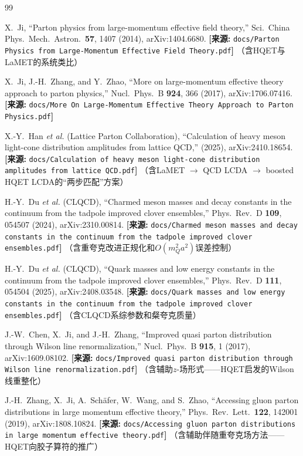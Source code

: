 \documentclass[12pt,a4paper]{ctexart}
\theoremstyle{definition}
\begin{document}
\begin{thebibliography}{99}

X.~Ji,
``Parton physics from large-momentum effective field theory,''
Sci.\ China Phys.\ Mech.\ Astron.\ \textbf{57}, 1407 (2014), arXiv:1404.6680.
\quad\textbf{[来源:} \texttt{docs/Parton Physics from Large-Momentum Effective Field Theory.pdf}\textbf{]}
（含HQET与LaMET的系统类比）

X.~Ji, J.-H.~Zhang, and Y.~Zhao,
``More on large-momentum effective theory approach to parton physics,''
Nucl.\ Phys.\ B \textbf{924}, 366 (2017), arXiv:1706.07416.
\quad\textbf{[来源:} \texttt{docs/More On Large-Momentum Effective Theory Approach to Parton Physics.pdf}\textbf{]}

X.-Y.~Han \textit{et al.} (Lattice Parton Collaboration),
``Calculation of heavy meson light-cone distribution amplitudes from lattice QCD,''
(2025), arXiv:2410.18654.
\quad\textbf{[来源:} \texttt{docs/Calculation of heavy meson light-cone distribution amplitudes from lattice QCD.pdf}\textbf{]}
（含LaMET $\to$ QCD LCDA $\to$ boosted HQET LCDA的``两步匹配''方案）

H.-Y.~Du \textit{et al.} (CLQCD),
``Charmed meson masses and decay constants in the continuum from the tadpole improved clover ensembles,''
Phys.\ Rev.\ D \textbf{109}, 054507 (2024), arXiv:2310.00814.
\quad\textbf{[来源:} \texttt{docs/Charmed meson masses and decay constants in the continuum from the tadpole improved clover ensembles.pdf}\textbf{]}
（含重夸克改进正规化和$O(m^2_Q a^2)$误差控制）

H.-Y.~Du \textit{et al.} (CLQCD),
``Quark masses and low energy constants in the continuum from the tadpole improved clover ensembles,''
Phys.\ Rev.\ D \textbf{111}, 054504 (2025), arXiv:2408.03548.
\quad\textbf{[来源:} \texttt{docs/Quark masses and low energy constants in the continuum from the tadpole improved clover ensembles.pdf}\textbf{]}
（含CLQCD系综参数和粲夸克质量）

J.-W.~Chen, X.~Ji, and J.-H.~Zhang,
``Improved quasi parton distribution through Wilson line renormalization,''
Nucl.\ Phys.\ B \textbf{915}, 1 (2017), arXiv:1609.08102.
\quad\textbf{[来源:} \texttt{docs/Improved quasi parton distribution through Wilson line renormalization.pdf}\textbf{]}
（含辅助$z$-场形式——HQET启发的Wilson线重整化）

J.-H.~Zhang, X.~Ji, A.~Sch\"afer, W.~Wang, and S.~Zhao,
``Accessing gluon parton distributions in large momentum effective theory,''
Phys.\ Rev.\ Lett.\ \textbf{122}, 142001 (2019), arXiv:1808.10824.
\quad\textbf{[来源:} \texttt{docs/Accessing gluon parton distributions in large momentum effective theory.pdf}\textbf{]}
（含辅助伴随重夸克场方法——HQET向胶子算符的推广）


\end{thebibliography}
\end{document}
